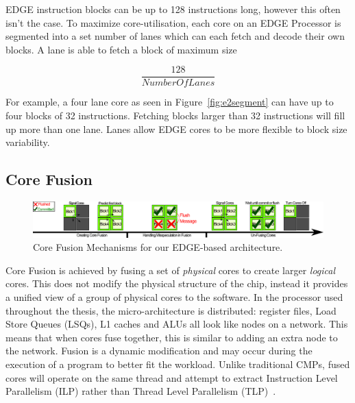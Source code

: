 EDGE instruction blocks can be up to 128 instructions long, however this often isn't the case.
To maximize core-utilisation, each core on an EDGE Processor is segmented into a set number of lanes which can each fetch and decode their own blocks.
A lane is able to fetch a block of maximum size

\begin{equation}
\frac{128}{NumberOfLanes}
\end{equation}

For example, a four lane core as seen in Figure~\ref{fig:e2segment} can have up to four blocks of 32 instructions.
Fetching blocks larger than 32 instructions will fill up more than one lane.
Lanes allow EDGE cores to be more flexible to block size variability.

\subsection{Core Fusion}
 \begin{figure}[t]
 \center
 \includegraphics[width=1\textwidth]{cases-paper/graphics/background/proc_test.pdf}
 \caption{Core Fusion Mechanisms for our EDGE-based architecture.}\label{fig:dmp}
 \end{figure}
 
Core Fusion is achieved by fusing a set of \textit{physical} cores to create larger \textit{logical} cores.
This does not modify the physical structure of the chip, instead it provides a unified view of a group of physical cores to the software.
In the processor used throughout the thesis, the micro-architecture is distributed: register files, Load Store Queues (LSQs), L1 caches and ALUs all look like nodes on a network.
This means that when cores fuse together, this is similar to adding an extra node to the network.
Fusion is a dynamic modification and may occur during the execution of a program to better fit the workload.
Unlike traditional CMPs, fused cores will operate on the same thread and attempt to extract Instruction Level Parallelism (ILP) rather than Thread Level Parallelism (TLP)~\cite{micolet2016dmpstream,pricopi2012bahurupi}.

